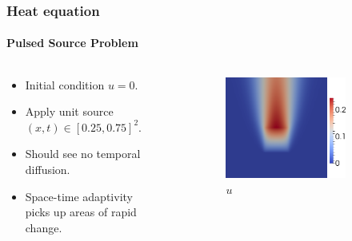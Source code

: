 \documentclass[18pt,xcolor=table]{beamer}
\begin{document}
\begin{frame}[t]
\frametitle{Heat equation}
\framesubtitle{Pulsed Source Problem}  %
\vspace{-1ex}
\begin{columns}[t] %
\begin{column}[c]{0.3\textwidth} %
\begin{itemize}
  \item Initial condition $u=0$.
  \item Apply unit source $(x,t)\in[0.25,0.75]^2$.
  \item Should see no temporal diffusion.
  \item Space-time adaptivity picks up areas of rapid change.
\end{itemize}
\end{column}
\begin{column}[c]{0.7\textwidth} %
\begin{figure}[ht]
\centering
\begin{subfigure}[t]{0.45\textwidth}
\centering
\includegraphics[height=0.8\textwidth]{SpaceTimeHeat/PulseSource/u.png}
\\$u$\\\vspace{1ex}
\end{subfigure}

\end{figure}
\end{column}
\end{columns}
\end{frame}
\end{document}
